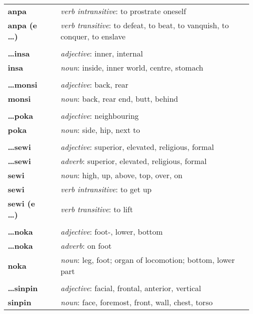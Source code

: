 \begin{supertabular}{p{2,5cm}|ll}
\textbf{anpa} && \textit{verb intransitive}: to prostrate oneself \\ %
\textbf{anpa (e \dots)} && \textit{verb transitive}: to defeat, to beat, to vanquish, to conquer, to enslave \\ %
 && \\ %
\textbf{\dots insa} && \textit{adjective}: inner, internal \\ %
\textbf{insa} && \textit{noun}: inside, inner world, centre, stomach \\ %
 && \\ %
\textbf{\dots monsi} && \textit{adjective}: back, rear \\ %
\textbf{monsi} && \textit{noun}: back, rear end, butt, behind \\ %
 && \\ %
\textbf{\dots poka} && \textit{adjective}: neighbouring \\ %
\textbf{poka} && \textit{noun}: side, hip, next to \\ %
 && \\ %
\textbf{\dots sewi} && \textit{adjective}: superior, elevated, religious, formal \\ %
\textbf{\dots sewi} && \textit{adverb}: superior, elevated, religious, formal \\ %
\textbf{sewi} && \textit{noun}: high, up, above, top, over, on \\ %
\textbf{sewi} && \textit{verb intransitive}: to get up \\ %
\textbf{sewi (e \dots)} && \textit{verb transitive}: to lift \\ %
 && \\ %
\textbf{\dots noka} && \textit{adjective}: foot-, lower, bottom \\  %
\textbf{ \dots noka } && \textit{adverb}: on foot \\  %
\textbf{noka} && \textit{noun}: leg, foot; organ of locomotion; bottom, lower part \\ %
 && \\ %
\textbf{\dots sinpin} && \textit{adjective}: facial, frontal, anterior, vertical \\ %
\textbf{sinpin} && \textit{noun}: face, foremost, front, wall, chest, torso \\ %
\end{supertabular} \\
%
\newpage
{}
